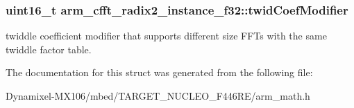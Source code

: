 \subsubsection[{\texorpdfstring{twid\+Coef\+Modifier}{twidCoefModifier}}]{\setlength{\rightskip}{0pt plus 5cm}uint16\+\_\+t arm\+\_\+cfft\+\_\+radix2\+\_\+instance\+\_\+f32\+::twid\+Coef\+Modifier}\hypertarget{structarm__cfft__radix2__instance__f32_a411f75b6ed01690293f4f5988030ea42}{}\label{structarm__cfft__radix2__instance__f32_a411f75b6ed01690293f4f5988030ea42}
twiddle coefficient modifier that supports different size F\+F\+Ts with the same twiddle factor table. 

The documentation for this struct was generated from the following file\+:\begin{DoxyCompactItemize}
\item 
Dynamixel-\/\+M\+X106/mbed/\+T\+A\+R\+G\+E\+T\+\_\+\+N\+U\+C\+L\+E\+O\+\_\+\+F446\+R\+E/arm\+\_\+math.\+h\end{DoxyCompactItemize}
